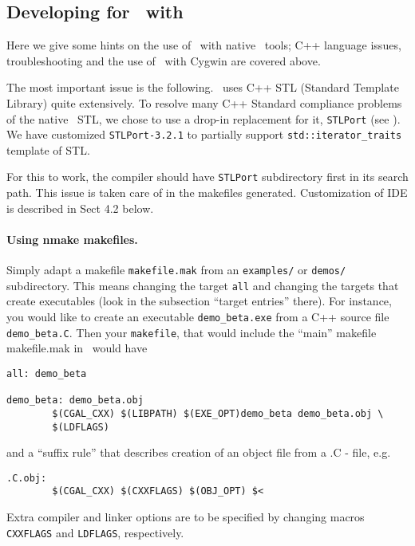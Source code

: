 \subsection{Developing for \cgal\ with }

Here we give some hints on the use of \cgal\ with native \msvc\ tools;
C++ language issues, troubleshooting and the use of \cgal\ with Cygwin
are covered above.

The most important issue is the following. \cgal\ uses C++ STL
(Standard Template Library) quite extensively.  To resolve many C++
Standard compliance problems of the native \msvc\ STL, we chose to use
a drop-in replacement for it, \texttt{STLPort} (see \stlportpage). We
have customized \texttt{STLPort-3.2.1} to partially support
\texttt{std::iterator\_traits} template of STL.

For this to work, the compiler should have \texttt{STLPort}
subdirectory first in its search path.  This issue is taken care of in
the makefiles generated.  Customization of IDE is described in Sect
4.2 below.


\paragraph{Using nmake makefiles.}
Simply adapt a makefile \texttt{makefile.mak} 
from an \texttt{examples/} or \texttt{demos/} subdirectory.
This means changing the target \texttt{all} and changing the targets that
create executables (look in the subsection ``target entries'' there).
For instance, you would like to create an executable \texttt{demo\_beta.exe}
from a C++ source file \texttt{demo\_beta.C}.  Then your 
\texttt{makefile}, that would
include the ``main'' makefile makefile.mak in \CGALR\ would have
\begin{verbatim}
all: demo_beta

demo_beta: demo_beta.obj
        $(CGAL_CXX) $(LIBPATH) $(EXE_OPT)demo_beta demo_beta.obj \
        $(LDFLAGS)
\end{verbatim}

and a ``suffix rule'' that describes creation of an object file from a
.C - file, e.g.
\begin{verbatim}
.C.obj:
        $(CGAL_CXX) $(CXXFLAGS) $(OBJ_OPT) $<
\end{verbatim}

Extra compiler and linker options are to be specified by changing
macros \texttt{CXXFLAGS} and \texttt{LDFLAGS}, respectively.

